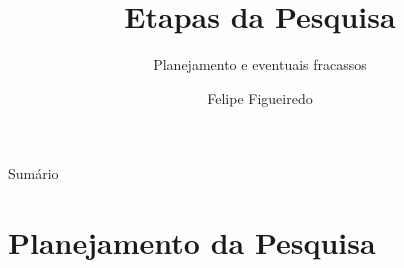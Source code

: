 \documentclass{beamer}
\title%
{Etapas da Pesquisa}
\subtitle
{Planejamento e eventuais fracassos} %
\author%
{Felipe Figueiredo}%
\institute[] %
{
}
\date%
{}
\begin{document}
\begin{frame}
  \titlepage
\end{frame}

\begin{frame}{Sumário}
  \tableofcontents
\end{frame}








\section{Planejamento da Pesquisa}
\end{document}
